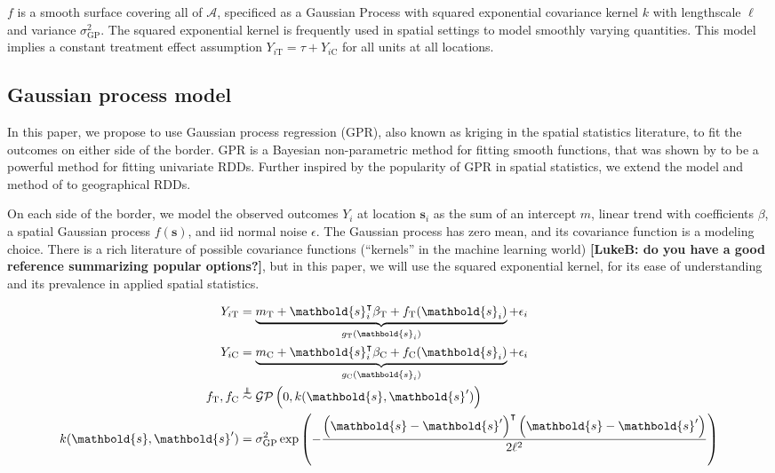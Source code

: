 \documentclass[letter]{article}
\newcommand{\gp}{\mathcal{GP}}
\newcommand{\trans}{^{\intercal}}
\newcommand{\area}{\mathcal{A}}
\newcommand{\treat}{\mathrm{T}}
\newcommand{\ctrol}{\mathrm{C}}
\newcommand{\sigmaf}{\sigma_{\mathrm{GP}}}
\newcommand{\svec}{\mathbold{s}}
\newcommand{\indep}{\protect\mathpalette{\protect\independenT}{\perp}}
\def\independenT#1#2{\mathrel{\rlap{$#1#2$}\mkern2mu{#1#2}}}
\newcommand{\eqlabel}[1]{\label{#1}}
\renewcommand{\cite}[1]{\citep{#1}}
\begin{document}
\(f\) is a smooth surface covering all of \(\area\), specificed as a Gaussian Process with squared exponential covariance kernel \(k\) with lengthscale \(\ell\) and variance \(\sigmaf^2\).
The squared exponential kernel is frequently used in spatial settings to model smoothly varying quantities.
This model implies a constant treatment effect assumption \(Y_{i\treat} = \tau + Y_{i\ctrol}\) for all units at all locations.
    


    	\subsection{Gaussian process model}\label{gaussian-process-model}
    

\label{sec:twogp}
    	In this paper, we propose to use Gaussian process regression (GPR), also known as kriging in the spatial statistics literature, to fit the outcomes on either side of the border.
GPR is a Bayesian non-parametric method for fitting smooth functions, that was shown by \cite{Branson:2017qy} to be a powerful method for fitting univariate RDDs.
Further inspired by the popularity of GPR in spatial statistics, we extend the model and method of \cite{Branson:2017qy} to geographical RDDs.

On each side of the border, we model the observed outcomes \(Y_i\) at location \(\svec_i\) as the sum of an intercept \(m\), linear trend with coefficients \(\beta\), a spatial Gaussian process \(f(\svec)\), and iid normal noise \(\epsilon\).
The Gaussian process has zero mean, and its covariance function is a modeling choice.
There is a rich literature of possible covariance functions (``kernels'' in the machine learning world) \textbf{{[}LukeB: do you have a good reference summarizing popular options?{]}}, but in this paper, we will use the squared exponential kernel, for its ease of understanding and its prevalence in applied spatial statistics.

\begin{equation}
\begin{split}
Y_{i\treat} &= \underbrace{m_\treat{} + \svec_i\trans\beta_\treat{} + f_\treat{}(\svec_i)}_{g_\treat{}(\svec_i)} + \epsilon_i \\
Y_{i\ctrol} &= \underbrace{m_\ctrol{} + \svec_i\trans\beta_\ctrol{} + f_\ctrol{}(\svec_i)}_{g_\ctrol{}(\svec_i)} + \epsilon_i \\
f_\treat{}, f_\ctrol{} &\overset{\indep}{\sim} \gp\del{0, k(\svec, \svec')} \\
k(\svec,\svec') &= \sigmaf^2 \exp\del{ - \frac{\del{\svec-\svec'}\trans\del{\svec-\svec'}}{2 \ell^2}}
\end{split}
\eqlabel{eq:spec2gp}
\end{equation}
    
\end{document}
